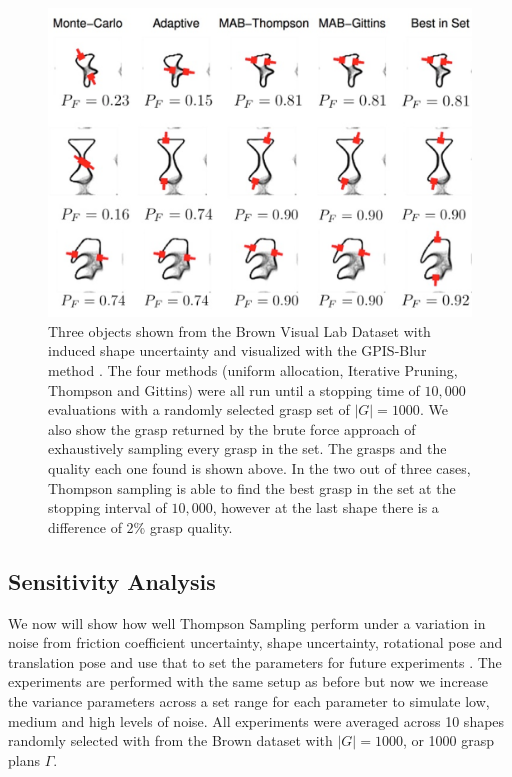 \documentclass[10pt, conference]{ieeeconf}      %
\begin{document}
\begin{figure}%
\label{fig:shape_examples}
    \centering
    \includegraphics[width=16.5cm]{figures/shapes.png}%
  
    \caption{Three objects shown from the Brown Visual Lab Dataset with induced shape uncertainty and visualized with the GPIS-Blur method \cite{mahler2015gp}. The four methods (uniform allocation, Iterative Pruning, Thompson and Gittins) were all run until a stopping time of $10,000$ evaluations with a randomly selected grasp set of $|G|=1000$. We also show the grasp returned by the brute force approach of exhaustively sampling every grasp in the set.  The grasps and the quality each one found is shown above.  In the two out of three cases, Thompson sampling is able to find the best grasp in the set at the stopping interval of $10,000$, however at the last shape there is a difference of $2\%$ grasp quality.   }%
    \label{fig:shape_samples}%
\end{figure}


\subsection{Sensitivity Analysis }\label{sec:sensitivity}
We now will show how well  Thompson Sampling perform under a variation in noise from friction coefficient uncertainty, shape uncertainty, rotational pose and translation pose and use that to set the parameters for future experiments . The experiments are performed with the same setup as before but now we increase the variance parameters across a set range for each parameter to simulate low, medium and high levels of noise. All experiments were averaged across 10 shapes randomly selected with from the Brown dataset with $|G| = 1000$, or 1000 grasp plans $\Gamma$. 
\end{document}
